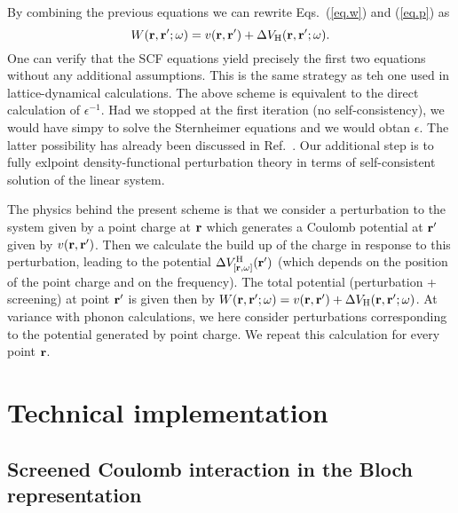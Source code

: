 \documentclass[twocolumn,prb,showpacs,superscriptaddress]{revtex4}
\def\w{\omega}
\def\r{{\bf r}}
\def\rp{{\bf r^\prime}}
\begin{document}
By combining the previous equations we can rewrite Eqs.\ (\ref{eq.w}) and (\ref{eq.p}) as
  \begin{equation}
  W(\r,\rp;\w) = v(\r,\rp) + \Delta V_{\rm H}(\r,\rp;\w).
  \end{equation}
One can verify that the SCF equations yield precisely the first two equations
without any additional assumptions. This is the same strategy as teh one used
in lattice-dynamical calculations.
The above scheme is equivalent to the direct calculation of $\epsilon^{-1}$.
Had we stopped at the first iteration (no self-consistency), we would have
simpy to solve the Sternheimer equations and we would obtan $\epsilon$.
The latter possibility has already been discussed in Ref.\ .
Our additional step is to fully exlpoint density-functional perturbation theory
in terms of self-consistent solution of the linear system.

The physics behind the present scheme is that we consider a perturbation to
the system given by a point charge at $\r$ which generates a Coulomb potential
at $\rp$ given by $v(\r,\rp)$. Then we calculate the build up of the charge
in response to this perturbation, leading to the potential $\Delta V^{\rm H}_{[\r,\w]}(\rp)$
(which depends on the position of the point charge and on the frequency).
The total potential (perturbation + screening) at point $\rp$ is given then
by $W(\r,\rp;\w) = v(\r,\rp) + \Delta V_{\rm H}(\r,\rp;\w)$.
At variance with phonon calculations, we here consider perturbations corresponding
to the potential generated by point charge. We repeat this calculation for
every point $\r$.

\section{Technical implementation}

\subsection{Screened Coulomb interaction in the Bloch representation}
\end{document}
